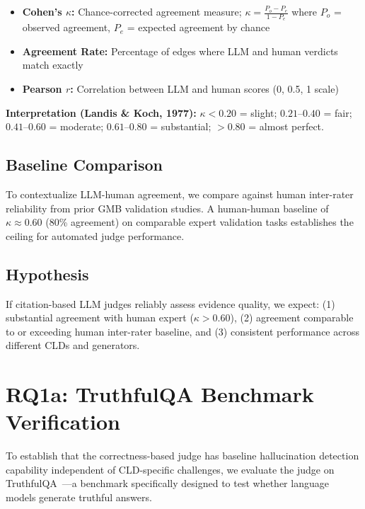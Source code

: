 \begin{itemize}[noitemsep]
    \item \textbf{Cohen's $\kappa$:} Chance-corrected agreement measure; $\kappa = \frac{P_o - P_e}{1 - P_e}$ where $P_o$ = observed agreement, $P_e$ = expected agreement by chance
    \item \textbf{Agreement Rate:} Percentage of edges where LLM and human verdicts match exactly
    \item \textbf{Pearson $r$:} Correlation between LLM and human scores (0, 0.5, 1 scale)
\end{itemize}

\textbf{Interpretation (Landis \& Koch, 1977):} $\kappa < 0.20$ = slight; $0.21$--$0.40$ = fair; $0.41$--$0.60$ = moderate; $0.61$--$0.80$ = substantial; $> 0.80$ = almost perfect.

\subsection{Baseline Comparison}

To contextualize LLM-human agreement, we compare against human inter-rater reliability from prior GMB validation studies. A human-human baseline of $\kappa \approx 0.60$ (80\% agreement) on comparable expert validation tasks establishes the ceiling for automated judge performance.

\subsection{Hypothesis}

If citation-based LLM judges reliably assess evidence quality, we expect: (1) substantial agreement with human expert ($\kappa > 0.60$), (2) agreement comparable to or exceeding human inter-rater baseline, and (3) consistent performance across different CLDs and generators.

\section{RQ1a: TruthfulQA Benchmark Verification}

To establish that the correctness-based judge has baseline hallucination detection capability independent of CLD-specific challenges, we evaluate the judge on TruthfulQA~\cite{lin2022truthfulqa}---a benchmark specifically designed to test whether language models generate truthful answers.

